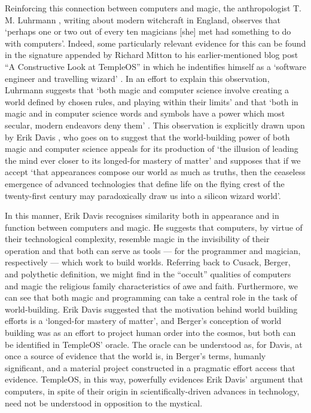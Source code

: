 \documentclass[Draft.tex]{subfiles}
\begin{document}
Reinforcing this connection between computers and magic,
the anthropologist T. M. Luhrmann \parencite*[106]{Luhrmann89},
writing about modern witchcraft in England, observes that
`perhaps one or two out of every ten magicians [she] met
had something to do with computers'.
Indeed, some particularly relevant evidence for this can be found
in the signature appended by Richard Mitton to his earlier-mentioned blog post
``A Constructive Look at TempleOS'' in which he indentifies himself as a
`software engineer and travelling wizard' \parencite{CodersNotes}.
In an effort to explain this observation, Luhrmann suggests that
`both magic and computer science involve creating a world
defined by chosen rules, and playing within their limits' and that
`both in magic and in computer science words and symbols have a power which
most secular, modern endeavors deny them' \parencite[106]{Luhrmann89}.
This observation is explicitly drawn upon by Erik Davis
\parencite*[181]{Davis98}, who goes on to suggest that the world-building
power of both magic and computer science appeals for its production of
`the illusion of leading the mind ever closer to its longed-for
mastery of matter' and supposes that if we accept
`that appearances compose our world as much as truths,
then the ceaseless emergence of advanced technologies that define life
on the flying crest of the twenty-first century may paradoxically draw us into
a silicon wizard world'.

In this manner, Erik Davis recognises similarity both in appearance
and in function between computers and magic.
He suggests that computers, by virtue of their technological complexity,
resemble magic in the invisibility of their operation and that both can
serve as tools --- for the programmer and magician, respectively ---
which work to build worlds.
Referring back to Cusack, Berger, and polythetic definition, we might find
in the ``occult'' qualities of computers and magic the religious family
characteristics of awe and faith.
Furthermore, we can see that both magic and programming can take a
central role in the task of world-building.
Erik Davis suggested that the motivation behind world building efforts
is a `longed-for mastery of matter', and Berger's conception of
world building was as an effort to project human order into the cosmos,
but both can be identified in TempleOS' oracle.
The oracle can be understood as, for Davis, at once a source of evidence
that the world is, in Berger's terms, humanly significant, and a material
project constructed in a pragmatic effort access that evidence.
TempleOS, in this way, powerfully evidences Erik Davis' argument that
computers, in spite of their origin in scientifically-driven advances in
technology, need not be understood in opposition to the mystical.
\end{document}
